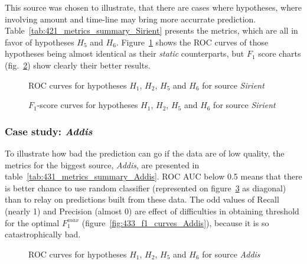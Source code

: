 \documentclass{article}
\begin{document}
This source was chosen to illustrate, that there are cases where hypotheses, where involving amount and time-line may bring more accurrate prediction.
Table\ \ref{tab:421_metrics_summary_Sirient} presents the metrics, which are all in favor of hypotheses $H_5$ and $H_6$.
Figure\ \ref{fig:422_roc_curves_Sirient} shows the ROC curves of those hypotheses being almost identical as their \textit{static} counterparts, but $F_1$ score charts (fig.\ \ref{fig:423_f1_curves_Sirient}) show clearly their better results.



\begin{figure}[htbp!]
    \begin{center}
        
    \caption{ROC curves for hypotheses $H_1$, $H_2$, $H_5$ and $H_6$ for source \textit{Sirient}}
    \label{fig:422_roc_curves_Sirient}
    \end{center}
\end{figure}

\begin{figure}[htbp!]
    \begin{center}
        
    \caption{$F_1$-score curves for hypotheses $H_1$, $H_2$, $H_5$ and $H_6$ for source \textit{Sirient}}
    \label{fig:423_f1_curves_Sirient}
    \end{center}
\end{figure}

\FloatBarrier

\subsubsection{Case study: \textit{Addis}}

To illustrate how bad the prediction can go if the data are of low quality,
the metrics for the biggest source, \textit{Addis}, are presented in table\ \ref{tab:431_metrics_summary_Addis}.
ROC AUC below 0.5 means that there is better chance to use random classifier
(represented on figure\ \ref{fig:432_roc_curves_Addis} as diagonal) than to relay on predictions built from these data.
The odd values of Recall (nearly 1) and Precision (almost 0) are effect of difficulties in obtaining
threshold for the optimal $F_1^{max}$ (figure\ \ref{fig:433_f1_curves_Addis}), because it is so catastrophically bad.



\begin{figure}[htbp!]
    \begin{center}
        
    \caption{ROC curves for hypotheses $H_1$, $H_2$, $H_5$ and $H_6$ for source \textit{Addis}}
    \label{fig:432_roc_curves_Addis}
    \end{center}
\end{figure}
\end{document}
